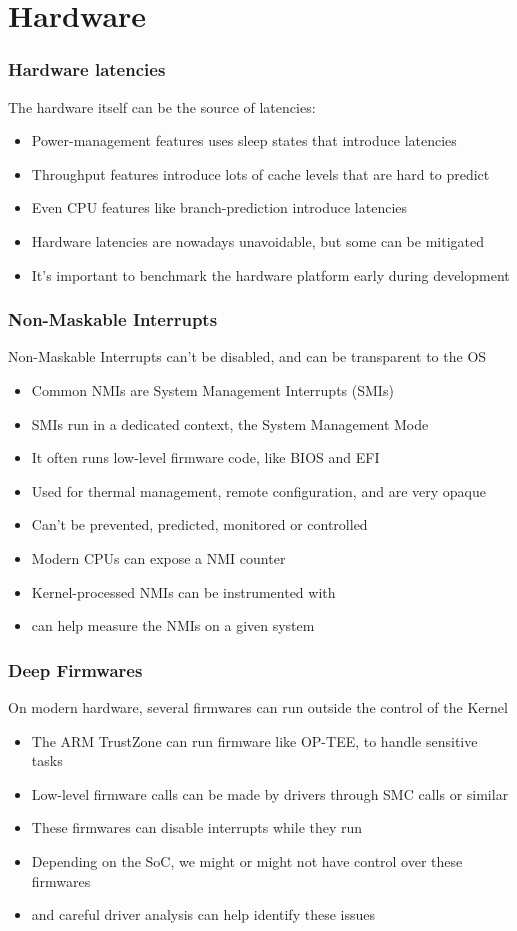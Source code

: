 \section{Hardware}

\begin{frame}
	\frametitle{Hardware latencies}
	The hardware itself can be the source of latencies:
	\begin{itemize}
		\item Power-management features uses sleep states that introduce latencies
		\item Throughput features introduce lots of cache levels that are hard to predict
		\item Even CPU features like branch-prediction introduce latencies
		\item Hardware latencies are nowadays unavoidable, but some can be mitigated
		\item It's important to benchmark the hardware platform early during development
	\end{itemize}
\end{frame}

\begin{frame}
	\frametitle{Non-Maskable Interrupts}
	Non-Maskable Interrupts can't be disabled, and can be transparent to the OS
	\begin{itemize}
		\item Common NMIs are System Management Interrupts (SMIs)
		\item SMIs run in a dedicated context, the System Management Mode
		\item It often runs low-level firmware code, like BIOS and EFI
		\item Used for thermal management, remote configuration, and are very opaque
		\item Can't be prevented, predicted, monitored or controlled
		\item Modern CPUs can expose a NMI counter
		\item Kernel-processed NMIs can be instrumented with 
		\item {} can help measure the NMIs on a given system
	\end{itemize}
\end{frame}

\begin{frame}
	\frametitle{Deep Firmwares}
	On modern hardware, several firmwares can run outside the control of the Kernel
	\begin{itemize}
		\item The ARM TrustZone can run firmware like OP-TEE, to handle sensitive tasks
		\item Low-level firmware calls can be made by drivers through SMC calls or similar
		\item These firmwares can disable interrupts while they run
		\item Depending on the SoC, we might or might not have control over these firmwares
		\item {} and careful driver analysis can help identify these issues
	\end{itemize}
\end{frame}


